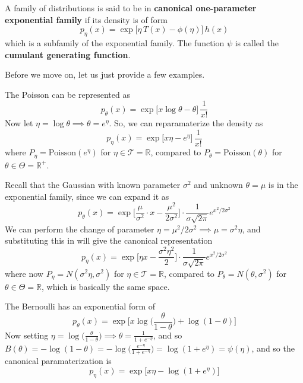 \documentclass{article}
\begin{document}
      \begin{definition}
      A family of distributions is said to be in \textbf{canonical one-parameter exponential family} if its density is of form 
      \[p_\eta (x) = \exp \big[ \eta \, T(x) - \phi(\eta) \big] \, h(x)\]
      which is a subfamily of the exponential family. The function $\psi$ is called the \textbf{cumulant generating function}. 
      \end{definition}

      Before we move on, let us just provide a few examples. 

      \begin{example}[Poisson]
      The Poisson can be represented as 
      \[p_\theta (x) = \exp \big[ x \log{\theta} - \theta \big] \, \frac{1}{x!}\]
      Now let $\eta = \log{\theta} \implies \theta = e^{\eta}$. So, we can reparamaterize the density as 
      \[p_\eta(x) = \exp \big[ x \eta - e^\eta \big] \, \frac{1}{x!}\]
      where $P_\eta = \mathrm{Poisson}(e^\eta)$ for $\eta \in \mathcal{T} = \mathbb{R}$, compared to $P_\theta = \mathrm{Poisson}(\theta)$ for $\theta \in \Theta = \mathbb{R}^+$. 
      \end{example}

      \begin{example}[Gaussian]
      Recall that the Gaussian with known parameter $\sigma^2$ and unknown $\theta = \mu$ is in the exponential family, since we can expand it as 
      \[p_\theta (x) = \exp \bigg[ \frac{\mu}{\sigma^2} \cdot x - \frac{\mu^2}{2 \sigma^2} \bigg] \cdot \frac{1}{\sigma \sqrt{2\pi}} e^{x^2/2 \sigma^2}\]
      We can perform the change of parameter $\eta = \mu^2 / 2\sigma^2 \implies \mu = \sigma^2 \eta$, and substituting this in will give the canonical representation 
      \[p_\eta (x) = \exp \Big[ \eta x - \frac{\sigma^2 \eta^2}{2} \Big] \cdot \frac{1}{\sigma \sqrt{2\pi}} e^{x^2/2 \sigma^2}\]
      where now $P_\eta = N(\sigma^2 \eta, \sigma^2)$ for $\eta \in \mathcal{T} = \mathbb{R}$, compared to $P_\theta = N(\theta, \sigma^2)$ for $\theta \in \Theta = \mathbb{R}$, which is basically the same space. 
      \end{example}

      \begin{example}[Bernoulli]
      The Bernoulli has an exponential form of 
      \[p_\theta (x) = \exp \bigg[ x \log \Big( \frac{\theta}{1 - \theta} \Big) + \log(1 - \theta)\bigg]\]
      Now setting $\eta = \log\big( \frac{\theta}{1 - \theta} \big) \implies \theta = \frac{1}{1 + e^{-\eta}}$, and so $B(\theta) = - \log(1 - \theta) = - \log \big( \frac{e^{-\eta}}{1 + e^{-\eta}} \big) = \log(1 + e^\eta) = \psi(\eta)$, and so the canonical paramaterization is 
      \[p_\eta (x) = \exp \big[ x \eta - \log(1 + e^{\eta}) \big]\]
      \end{example}
\end{document}
